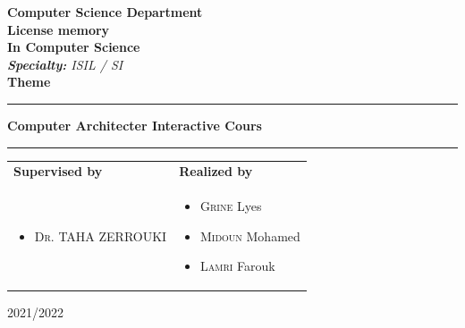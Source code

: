 \begin{titlepage}
\begin{center}
{ \textbf{Computer Science Department}}\\ \vspace{0.8cm}
\Huge{\textbf{License memory}} \\ \Large{\textbf{In Computer Science}} \\\vspace{0.3cm}
\large{\emph{\textbf{Specialty: } ISIL / SI}}\\ \vspace{0.8cm}
\huge{\textbf{Theme}}\\ %
\noindent\rule{\textwidth}{1mm}
\Large{\textbf{Computer Architecter Interactive Cours}}
\noindent\rule{\textwidth}{1mm}
\end{center}
\vspace{0.3cm}
\begin{tabular}{ p{9cm}  p{6cm} }
\textbf{Supervised by} & \textbf{Realized by} \\
\begin{itemize}
	\item \textsc{Dr.} TAHA ZERROUKI
\end{itemize}
&
\begin{itemize}
	\item \textsc{Grine} Lyes
	\item \textsc{Midoun} Mohamed
  \item \textsc{Lamri} Farouk
\end{itemize}
\\
\end{tabular}
\vspace{3.5cm}
\begin{center}
2021/2022
\end{center}

\end{titlepage}